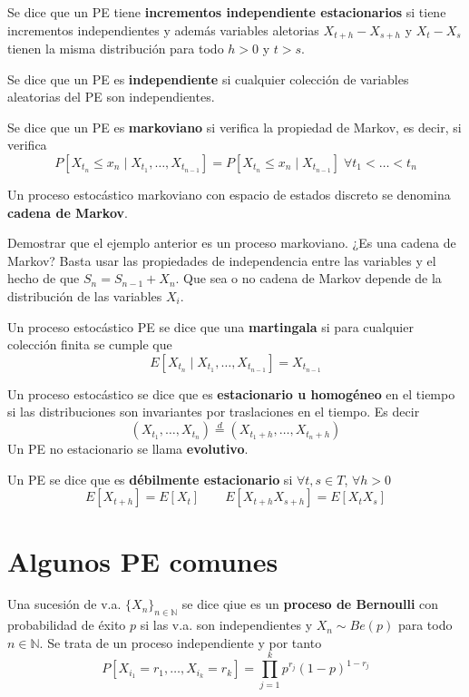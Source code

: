 \documentclass[PREyA.tex]{subfiles}
\begin{document}
\begin{defi}
Se dice que un PE tiene \textbf{incrementos independiente estacionarios} si tiene incrementos independientes y además variables aletorias $X_{t+h} - X_{s+h}$ y $X_t - X_s$ tienen la misma distribución para todo $h>0$ y $t> s$. 
\end{defi}
\begin{defi}
Se dice que un PE es \textbf{independiente} si cualquier colección de variables aleatorias del PE son independientes.
\end{defi}
\newpage
\begin{defi}
Se dice que un PE es \textbf{markoviano} si verifica la propiedad de Markov, es decir, si verifica
$$
P[X_{t_n} \leq x_n \mid X_{t_1},\dotsc, X_{t_{n-1}}] = P[X_{t_n} \leq x_n \mid X_{t_{n-1}}] \;\forall t_1 < \dotsc < t_n
$$
\end{defi}
\begin{defi}
Un proceso estocástico markoviano con espacio de estados discreto se denomina \textbf{cadena de Markov}.
\end{defi}
\begin{example} Demostrar que el ejemplo anterior es un proceso markoviano. ¿Es una cadena de Markov? Basta usar las propiedades de independencia entre las variables y el hecho de que $S_n = S_{n-1}+X_n$. Que sea o no cadena de Markov depende de la distribución de las variables $X_i$.
\end{example}
\begin{defi}
Un proceso estocástico PE se dice que una \textbf{martingala} si para cualquier colección finita se cumple que 
$$
E[X_{t_n} \mid X_{t_1},\dotsc,X_{t_{n-1}}] = X_{t_{n-1}}
$$
\end{defi}
\begin{defi}
Un proceso estocástico se dice que es \textbf{estacionario u homogéneo} en el tiempo si las distribuciones son invariantes por traslaciones en el tiempo. Es decir
$$
(X_{t_1}, \dotsc, X_{t_n} ) \overset{d}{=} (X_{t_1+h},\dotsc, X_{t_n+h} )
$$
Un PE no estacionario se llama \textbf{evolutivo}.
\end{defi}
\begin{defi}
Un PE se dice que es \textbf{débilmente estacionario} si $\forall t,s \in T$, $\forall h>0$
$$E[X_{t+h}] = E[X_t] \qquad E[X_{t+h}X_{s+h}]  = E[X_tX_s]$$
\end{defi}

\section{Algunos PE comunes}
\begin{defi}
Una sucesión de v.a. $\{X_n\}_{n \in \mathbb{N}}$ se dice qiue es un \textbf{proceso de Bernoulli} con probabilidad de éxito $p$ si las v.a. son independientes y $X_n \sim Be(p)$ para todo $n \in \mathbb{N}$. Se trata de un proceso independiente y por tanto
$$
P[X_{i_1} = r_1,\dotsc,X_{i_k}=r_k] = \prod_{j=1}^k p^{r_j}(1-p)^{1-r_j}
$$
\end{defi}
\end{document}
